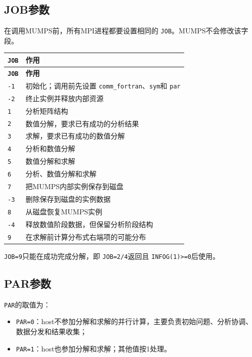 \subsection{JOB参数}

在调用MUMPS前，所有MPI进程都要设置相同的 \texttt{JOB}。MUMPS不会修改该字段。

\begin{longtable}{p{}p{}}
\toprule
\textbf{\texttt{JOB}} & \textbf{作用} \\
\midrule
\endfirsthead
\toprule
\textbf{\texttt{JOB}} & \textbf{作用} \\
\midrule
\endhead
\texttt{-1} & 初始化；调用前先设置 \texttt{comm\_fortran}、\texttt{sym}和 \texttt{par} \\
\texttt{-2} & 终止实例并释放内部资源 \\
\texttt{1} & 分析矩阵结构 \\
\texttt{2} & 数值分解，要求已有成功的分析结果 \\
\texttt{3} & 求解，要求已有成功的数值分解 \\
\texttt{4} & 分析和数值分解 \\
\texttt{5} & 数值分解和求解 \\
\texttt{6} & 分析、数值分解和求解 \\
\texttt{7} & 把MUMPS内部实例保存到磁盘 \\
\texttt{-3} & 删除保存到磁盘的实例数据 \\
\texttt{8} & 从磁盘恢复MUMPS实例 \\
\texttt{-4} & 释放数值阶段数据，但保留分析阶段结构 \\
\texttt{9} & 在求解前计算分布式右端项的可能分布 \\
\bottomrule
\end{longtable}

\texttt{JOB=9}只能在成功完成分解，即 \texttt{JOB=2/4}返回且 \texttt{INFOG(1)\textgreater{}=0}后使用。

\subsection{PAR参数}

\texttt{PAR}的取值为：

\begin{itemize}
  \item \texttt{PAR=0}：host不参加分解和求解的并行计算，主要负责初始问题、分析协调、数据分发和结果收集；
  \item \texttt{PAR=1}：host也参加分解和求解；其他值按1处理。
\end{itemize}

